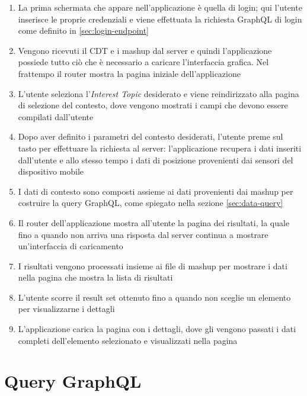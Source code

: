 \begin{enumerate}
	\item La prima schermata che appare nell'applicazione è quella di login; qui l'utente inserisce le proprie credenziali e viene effettuata la richiesta GraphQL di login come definito in \ref{sec:login-endpoint}
	\item Vengono ricevuti il CDT e i mashup dal server e quindi l'applicazione possiede tutto ciò che è necessario a caricare l'interfaccia grafica. Nel frattempo il router mostra la pagina iniziale dell'applicazione
	\item L'utente seleziona l'\emph{Interest Topic} desiderato e viene reindirizzato alla pagina di selezione del contesto, dove vengono mostrati i campi che devono essere compilati dall'utente
	\item Dopo aver definito i parametri del contesto desiderati, l'utente preme sul tasto per effettuare la richiesta al server: l'applicazione recupera i dati inseriti dall'utente e allo stesso tempo i dati di posizione provenienti dai sensori del dispositivo mobile
	\item I dati di contesto sono composti assieme ai dati provenienti dai mashup per costruire la query GraphQL, come spiegato nella sezione \ref{sec:data-query}
	\item Il router dell'applicazione mostra all'utente la pagina dei risultati, la quale fino a quando non arriva una risposta dal server continua a mostrare un'interfaccia di caricamento
	\item I risultati vengono processati insieme ai file di mashup per mostrare i dati nella pagina che mostra la lista di risultati
	\item L'utente scorre il result set ottenuto fino a quando non sceglie un elemento per visualizzarne i dettagli
	\item L'applicazione carica la pagina con i dettagli, dove gli vengono passati i dati completi dell'elemento selezionato e visualizzati nella pagina
\end{enumerate}

\section{Query GraphQL}\label{sec:utilizzo-dati-app}

